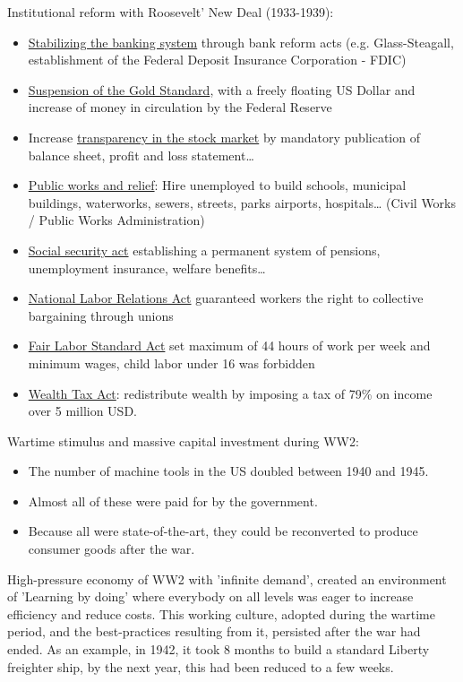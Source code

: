 Institutional reform with Roosevelt' New Deal (1933-1939):
\begin{itemize}
    \item \underline{Stabilizing the banking system} through bank reform acts
        (e.g. Glass-Steagall, establishment of the Federal Deposit Insurance
        Corporation - FDIC)
    \item \underline{Suspension of the Gold Standard}, with a freely floating
        US Dollar and increase of money in circulation by the Federal Reserve
    \item Increase \underline{transparency in the stock market} by mandatory
        publication of balance sheet, profit and loss statement\dots
    \item \underline{Public works and relief}: Hire unemployed to build schools,
        municipal buildings, waterworks, sewers, streets, parks airports, hospitals\dots
        (Civil Works / Public Works Administration)
    \item \underline{Social security act} establishing a permanent system of
        pensions, unemployment insurance, welfare benefits\dots
    \item \underline{National Labor Relations Act} guaranteed workers the
        right to collective bargaining through unions
    \item \underline{Fair Labor Standard Act} set maximum of 44 hours of work
        per week and minimum wages, child labor under 16 was forbidden
    \item \underline{Wealth Tax Act}: redistribute wealth by imposing a tax
        of 79\% on income over 5 million USD.
\end{itemize}

Wartime stimulus and massive capital investment during WW2:
\begin{itemize}
    \item The number of machine tools in the US doubled between 1940 and 1945.
    \item Almost all of these were paid for by the government.
    \item Because all were state-of-the-art, they could be reconverted to produce
        consumer goods after the war.
\end{itemize}

High-pressure economy of WW2 with 'infinite demand', created an environment
of 'Learning by doing' where everybody on all levels was eager to increase
efficiency and reduce costs. This working culture, adopted during the wartime
period, and the best-practices resulting from it, persisted after the war had
ended. As an example, in 1942, it took 8 months to build a standard Liberty
freighter ship, by the next year, this had been reduced to a few weeks.


